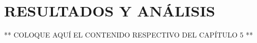 \chapter{RESULTADOS Y ANÁLISIS}
\thispagestyle{empty}

** COLOQUE AQUÍ EL CONTENIDO RESPECTIVO DEL CAPÍTULO 5 **